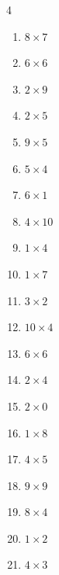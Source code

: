 \begin{multicols}{4}
\begin{enumerate}
  \item $8\times 7$
        \phantom{$=56$}

  \item $6\times 6$
        \phantom{$=36$}

  \item $2\times 9$
        \phantom{$=18$}

  \item $2\times 5$
        \phantom{$=10$}

  \item $9\times 5$
        \phantom{$=45$}

  \item $5\times 4$
        \phantom{$=20$}

\columnbreak %

  \item $6\times 1$
        \phantom{$=6$}

  \item $4\times 10$
        \phantom{$=40$}

  \item $1\times 4$
        \phantom{$=4$}

  \item $1\times 7$
        \phantom{$=7$}

  \item $3\times 2$
        \phantom{$=6$}

  \item $10\times 4$
        \phantom{$=40$}

  \item $6\times 6$
        \phantom{$=36$}

  \item $2\times 4$
        \phantom{$=8$}

  \item $2\times 0$
        \phantom{$=0$}

  \item $1\times 8$
        \phantom{$=8$}

  \item $4\times 5$
        \phantom{$=20$}

  \item $9\times 9$
        \phantom{$=81$}

  \item $8\times 4$
        \phantom{$=32$}

  \item $1\times 2$
        \phantom{$=2$}

  \item $4\times 3$
        \phantom{$=12$}


\end{enumerate}
\end{multicols}
